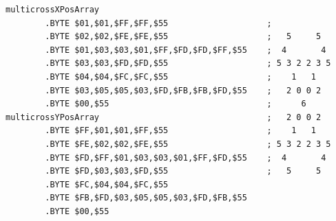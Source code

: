 \begin{lstlisting}
multicrossXPosArray 
        .BYTE $01,$01,$FF,$FF,$55                    ;
        .BYTE $02,$02,$FE,$FE,$55                    ;   5     5  
        .BYTE $01,$03,$03,$01,$FF,$FD,$FD,$FF,$55    ;  4       4 
        .BYTE $03,$03,$FD,$FD,$55                    ; 5 3 2 2 3 5
        .BYTE $04,$04,$FC,$FC,$55                    ;    1   1   
        .BYTE $03,$05,$05,$03,$FD,$FB,$FB,$FD,$55    ;   2 0 0 2  
        .BYTE $00,$55                                ;      6     
multicrossYPosArray                                  ;   2 0 0 2  
        .BYTE $FF,$01,$01,$FF,$55                    ;    1   1   
        .BYTE $FE,$02,$02,$FE,$55                    ; 5 3 2 2 3 5
        .BYTE $FD,$FF,$01,$03,$03,$01,$FF,$FD,$55    ;  4       4 
        .BYTE $FD,$03,$03,$FD,$55                    ;   5     5  
        .BYTE $FC,$04,$04,$FC,$55                    
        .BYTE $FB,$FD,$03,$05,$05,$03,$FD,$FB,$55    
        .BYTE $00,$55
\end{lstlisting}


